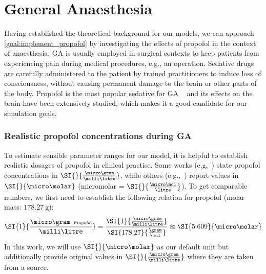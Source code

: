 \section{General Anaesthesia}\label{sec:general-anaesthesia}
Having established the theoretical background for our models,
we can approach \ref{goal:implement_propofol} by investigating the effects of propofol in the context of anaesthesia.
GA is usually employed in surgical contexts to keep patients from experiencing pain during medical
procedures, e.g., an operation.
Sedative drugs are carefully administered to the patient by trained practitioners to induce loss of consciousness,
without causing permanent damage to the brain or other parts of the body.
Propofol is the most popular sedative for GA ~\cite{miner_clinical_2007, sahinovic_clinical_2018}
and its effects on the brain have been extensively studied,
which makes it a good candidate for our simulation goals.

\subsubsection{Realistic propofol concentrations during GA}\label{subsubsec:realistic-prop-conc-during-ga}
To estimate sensible parameter ranges for our model,
it is helpful to establish realistic dosages of propofol in clinical practise.
Some works (e.g,~\cite{iwakiri_individual_2005, ferreira_patterns_2020}) state propofol concentrations in $\SI{}{\frac{\micro\gram}{\milli\litre}}$,
while others (e.g.,~\cite{kitamura_effects_2003, mcdougall_propofol_2008}) report values in $\SI{}{\micro\molar}$ (micromolar =
$\SI{}{\frac{\micro\mol}{\litre}}$).
To get comparable numbers, we first need to establish the following relation for propofol
(molar mass: $\SI{178.27}{\gram}$):
\[ \SI{1}{\frac{\micro\gram\hspace{0.5em}\text{\tiny{Propofol}}}{\milli\litre}}  =
\frac{ \SI{1}{\frac{\micro\gram}{\milli\litre}}}{\SI{178.27}{\frac{\gram}{\mol}}} \approxeq \SI{5.609}{\micro\molar} \]
In this work, we will use $\SI{}{\micro\molar}$ as our default unit
but additionally provide original values in $\SI{}{\frac{\micro\gram}{\milli\litre}}$ where they are taken from a source.

